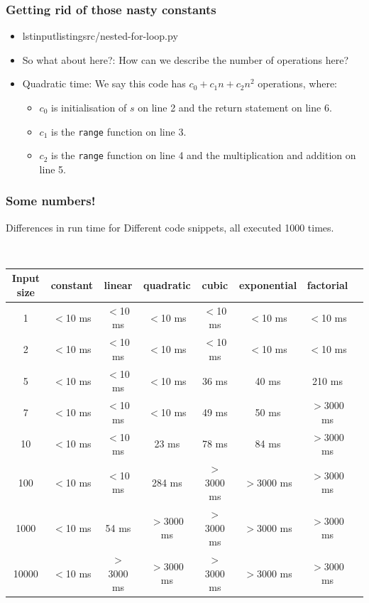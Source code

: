 \begin{frame}
	\frametitle{Getting rid of those nasty constants}

	\begin{itemize}
		\item lstinputlisting{src/nested-for-loop.py}
		\item So what about here?:	How can we describe the number of operations here?	
		\item Quadratic time:
				We say this code has $c_0 + c_1n + c_2 n^2$ operations, where:
				\begin{itemize}
					\item $c_0$ is initialisation of $s$ on line 2 and the return statement on line 6.
					\item $c_1$ is the \texttt{range} function on line 3.
					\item $c_2$ is the \texttt{range} function on line 4 and the multiplication and addition on line 5.
				\end{itemize}
			\end{itemize}
\end{frame}

\begin{frame}
	\frametitle{Some numbers!}
	
Differences in run time for	Different code snippets, all executed 1000 times.

		\hfill\\
		\begin{tabular}{c | c c c c c c c}
			\scriptsize
			Input size & constant & linear & quadratic & cubic & exponential & factorial\\
			\midrule
			
			1 & $<$10 ms & $<$10 ms & $<$10 ms & $<$10 ms & $<$10 ms & $<$10 ms\\
			2 & $<$10 ms & $<$10 ms & $<$10 ms & $<$10 ms & $<$10 ms & $<$10 ms\\
			
			5 & $<$10 ms & $<$10 ms & $<$10 ms & 36 ms & 40 ms & 210 ms\\
			
			7 & $<$10 ms & $<$10 ms & $<$10 ms & 49 ms & 50 ms & \alert{$>$3000 ms} \\
			
			10 & $<$10 ms & $<$10 ms & 23 ms & 78 ms & 84 ms & \alert{$>$3000 ms}\\
			
			100 & $<$10 ms & $<$10 ms & 284 ms & \alert{$>$3000 ms} & \alert{$>$3000 ms} & \alert{$>$3000 ms} \\
			
			1000 & $<$10 ms & 54 ms & \alert{$>$3000 ms} &\alert{$>$3000 ms} & \alert{$>$3000 ms} & \alert{$>$3000 ms} \\
			
			10000 & $<$10 ms &  \alert{$>$3000 ms} &\alert{$>$3000 ms} &\alert{$>$3000 ms} & \alert{$>$3000 ms} & \alert{$>$3000 ms} \\
		\end{tabular}
\end{frame}

